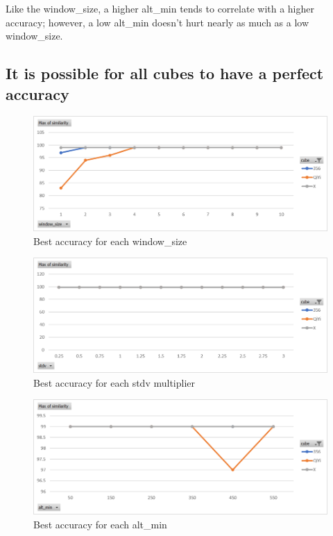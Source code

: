 Like the window\_size, a higher alt\_min tends to correlate with a
higher accuracy; however, a low alt\_min doesn't hurt nearly as much as
a low window\_size.

\subsection{It is possible for all cubes to have a perfect accuracy}

\begin{figure}[h]
    \centering
    \caption{Best accuracy for each window\_size}
    \label{fig:max-similarity-by-window-size}
    \includegraphics[width=0.75\linewidth]{Figures/7 Evaluation/max_similarity_by_window_size.png}
\end{figure}

\begin{figure}[h]
    \centering
    \caption{Best accuracy for each stdv multiplier}
    \label{fig:max-similarity-by-stdv}
    \includegraphics[width=0.75\linewidth]{Figures/7 Evaluation/max_similarity_by_stdv.png}
\end{figure}

\begin{figure}[h]
    \centering
    \caption{Best accuracy for each alt\_min}
    \label{fig:max-similarity-by-alt-min}
    \includegraphics[width=0.75\linewidth]{Figures/7 Evaluation/max_similarity_by_alt_min.png}
\end{figure}

